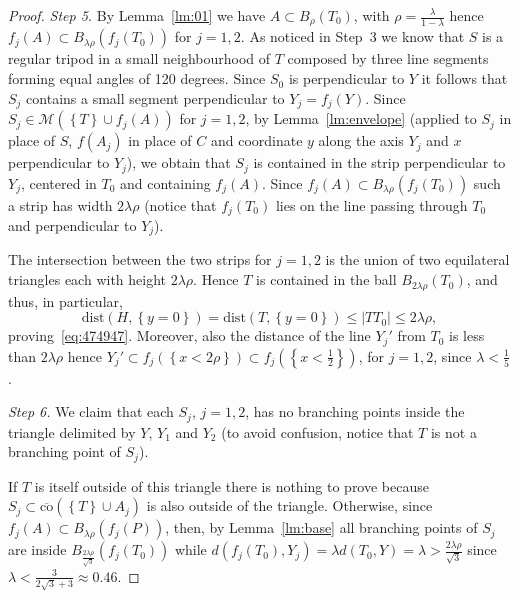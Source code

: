 \documentclass{amsart}
\newcommand{\abs}[1]{\left\vert #1 \right\vert}
\newcommand{\ENCLOSE}[1]{\left\{#1\right\}}
\newcommand{\M}{\mathcal{M}}
\newcommand{\dist}{\mathrm{dist}}
\newcommand{\co}{\mathrm{co}}
\theoremstyle{definition}
\theoremstyle{remark}
\begin{document}
\begin{proof}
  \emph{Step 5.}
  By Lemma~\ref{lm:01} we have $A\subset B_\rho(T_0)$,
  with $\rho=\frac{\lambda}{1-\lambda}$
  hence $f_j(A) \subset B_{\lambda\rho}(f_j(T_0))$
  for $j=1,2$.
  As noticed in Step~3 we know that $S$ is a regular tripod in a small 
  neighbourhood of $T$ composed by three line segments forming 
  equal angles of 120 degrees. Since $S_0$ is perpendicular to $Y$ 
  it follows that $S_j$ contains a small segment perpendicular to $Y_j=f_j(Y)$.
  Since $S_j\in \M(\ENCLOSE{T}\cup f_j(A))$ for $j=1,2$,
  by Lemma~\ref{lm:envelope} (applied to $S_j$ in place of $S$, 
  $f(A_j)$ in place of $C$ and coordinate $y$ along the axis $Y_j$ 
  and $x$ perpendicular to $Y_j$),
  we obtain that $S_j$ is contained in the strip perpendicular 
  to $Y_j$, centered in $T_0$ and containing $f_j(A)$. 
  Since $f_j(A)\subset B_{\lambda\rho}(f_j(T_0))$
  such a strip has width $2\lambda\rho$
  (notice that $f_j(T_0)$ lies on the line passing through $T_0$ and perpendicular 
  to $Y_j$).
  
  The intersection between the two strips for $j=1,2$ 
  is the union of two equilateral 
  triangles each with height $2\lambda\rho$. 
  Hence $T$ is contained in the ball
  $B_{2\lambda\rho}(T_0)$, 
  and thus, in particular, 
  \[
    \dist(H,\ENCLOSE{y=0})= \dist(T,\ENCLOSE{y=0})\le \abs{TT_0} \le 2\lambda\rho,
  \]
  proving~\eqref{eq:474947}.
  Moreover, also the distance of the line $Y_j'$ from $T_0$ is less than 
  $2\lambda\rho$ hence $Y_j'\subset f_j(\ENCLOSE{x<2\rho})
  \subset f_j(\ENCLOSE{x<\frac 1 2})$, for $j=1,2$, since $\lambda < \frac 1 5$.
  
  \emph{Step 6.}
  We claim that each $S_j$, $j=1,2$, has no branching points inside the triangle 
  delimited by $Y$, $Y_1$ and $Y_2$ 
  (to avoid confusion, notice that $T$ is not a branching point of $S_j$).
 
  If $T$ is itself outside of this triangle there is nothing to prove
  because $S_j\subset \overline{\co}(\ENCLOSE{T}\cup A_j)$ 
  is also outside of the triangle.
  Otherwise, 
  since $f_j(A)\subset B_{\lambda\rho}(f_j(P))$,
  then, by Lemma~\ref{lm:base} all branching points of $S_j$ 
  are inside $B_{\frac{2\lambda \rho}{\sqrt 3}}(f_j(T_0))$ while 
  $d(f_j(T_0),Y_j)=\lambda d(T_0,Y)
  = \lambda > \frac{2\lambda \rho}{\sqrt 3}$
  since $\lambda < \frac{3}{2\sqrt 3+3}\approx 0.46$.


\end{proof}
\end{document}
